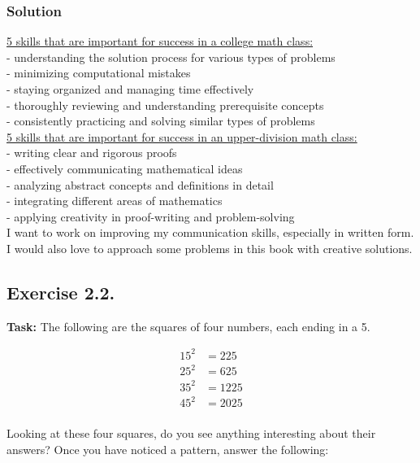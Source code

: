 \documentclass{article}
\begin{document}
\subsubsection*{Solution}

\underline{5 skills that are important for success in a college math class:}\\
- understanding the solution process for various types of problems\\
- minimizing computational mistakes\\
- staying organized and managing time effectively\\
- thoroughly reviewing and understanding prerequisite concepts\\
- consistently practicing and solving similar types of problems\\

\noindent \underline{5 skills that are important for success in an upper-division math class:}\\
- writing clear and rigorous proofs\\
- effectively communicating mathematical ideas\\
- analyzing abstract concepts and definitions in detail\\
- integrating different areas of mathematics\\
- applying creativity in proof-writing and problem-solving\\

\noindent I want to work on improving my communication skills, especially in written form. I would also love to approach some problems in this book with creative solutions.


\newpage

\subsection{Exercise 2.2.}
\textbf{Task:} The following are the squares of four numbers, each ending in a 5.

\begin{align*}
    15^2 &= 225\\
    25^2 &= 625\\
    35^2 &= 1225\\
    45^2 &= 2025\\
\end{align*}

\noindent Looking at these four squares, do you see anything interesting about their answers? Once you have noticed a pattern, answer the following:\\
\end{document}
